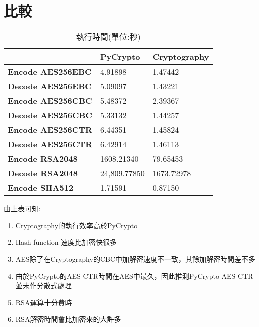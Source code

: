 \documentclass{article}
\begin{document}
\section{比較}
\begin{table}[H]
\centering
\caption{執行時間(單位:秒)}
\label{my-label}
\begin{tabular}{|l|l|l|}
\hline
\textbf{}                 & \textbf{PyCrypto}                     & \textbf{Cryptography}                 \\ \hline
\textbf{Encode AES256EBC} & 4.91898                               & 1.47442                               \\ \hline
\textbf{Decode AES256EBC} & 5.09097                               & 1.43221                               \\ \hline
\textbf{Encode AES256CBC} & 5.48372                               & 2.39367                               \\ \hline
\textbf{Decode AES256CBC} & 5.33132                               & 1.44257                               \\ \hline
\textbf{Encode AES256CTR} & 6.44351                               & 1.45824                               \\ \hline
\textbf{Decode AES256CTR} & 6.42914                               & 1.46113                               \\ \hline
\textbf{Encode RSA2048}   & {\color[HTML]{CB0000} 1608.21340}     & {\color[HTML]{CB0000} 79.65453}       \\ \hline
\textbf{Decode RSA2048}   & {\color[HTML]{CB0000} 24,809.77850}   & {\color[HTML]{CB0000} 1673.72978}     \\ \hline
\textbf{Encode SHA512}    & 1.71591                               & 0.87150                               \\ \hline
\end{tabular}
\end{table}
\quad 由上表可知:
\begin{enumerate}
    \item Cryptography的執行效率高於PyCrypto
    \item Hash function 速度比加密快很多
	\item AES除了在Cryptography的CBC中加解密速度不一致，其餘加解密時間差不多
	\item 由於PyCrypto的AES CTR時間在AES中最久，因此推測PyCrypto AES CTR並未作分散式處理
	\item \color[HTML]{CB0000}RSA運算十分費時\color[HTML]{000000}
	\item RSA解密時間會比加密來的\color[HTML]{CB0000}大許多
\end{enumerate}
\end{document}
